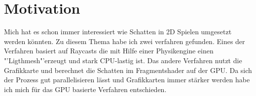 \chapter{Motivation}
Mich hat es schon immer interessiert wie Schatten in 2D Spielen umgesetzt werden könnten.
Zu diesem Thema habe ich zwei verfahren gefunden. Eines der Verfahren basiert auf Raycasts die mit Hilfe einer Physikengine einen "'Ligthmesh"'erzeugt und stark CPU-lastig ist. Das andere Verfahren nutzt die Grafikkarte und berechnet die Schatten im Fragmentshader auf der GPU.
Da sich der Prozess gut parallelisieren lässt und Grafikkarten immer stärker werden habe ich mich für das GPU basierte Verfahren entschieden. 
